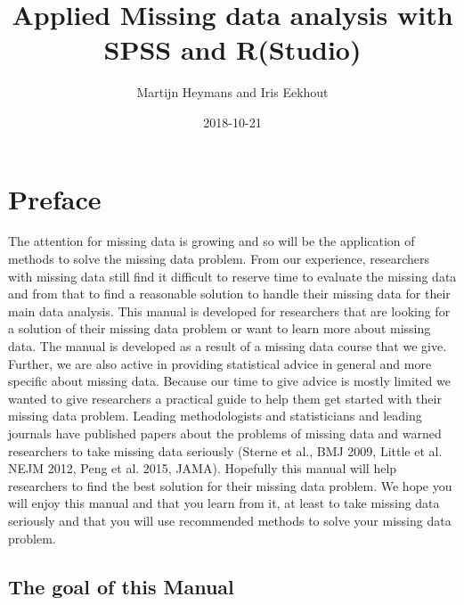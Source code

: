 \documentclass[]{book}
\title{Applied Missing data analysis with SPSS and R(Studio)}
\author{Martijn Heymans and Iris Eekhout}
\date{2018-10-21}
\theoremstyle{definition}
\theoremstyle{definition}
\theoremstyle{definition}
\theoremstyle{remark}
\begin{document}
\maketitle

{
\setcounter{tocdepth}{1}
\tableofcontents
}
\chapter*{Preface}\label{preface}

The attention for missing data is growing and so will be the application
of methods to solve the missing data problem. From our experience,
researchers with missing data still find it difficult to reserve time to
evaluate the missing data and from that to find a reasonable solution to
handle their missing data for their main data analysis. This manual is
developed for researchers that are looking for a solution of their
missing data problem or want to learn more about missing data. The
manual is developed as a result of a missing data course that we give.
Further, we are also active in providing statistical advice in general
and more specific about missing data. Because our time to give advice is
mostly limited we wanted to give researchers a practical guide to help
them get started with their missing data problem. Leading methodologists
and statisticians and leading journals have published papers about the
problems of missing data and warned researchers to take missing data
seriously (Sterne et al., BMJ 2009, Little et al. NEJM 2012, Peng et al.
2015, JAMA). Hopefully this manual will help researchers to find the
best solution for their missing data problem. We hope you will enjoy
this manual and that you learn from it, at least to take missing data
seriously and that you will use recommended methods to solve your
missing data problem.

\section{The goal of this Manual}\label{the-goal-of-this-manual}
\end{document}
